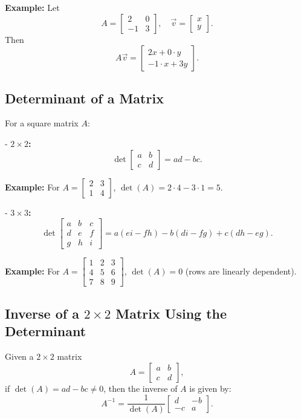 \documentclass{article}
\begin{document}
\begin{multicols}{2}
\textbf{Example:} Let
\[
A = \begin{bmatrix}2 & 0\\-1 & 3\end{bmatrix},
\quad
\vec{v} = \begin{bmatrix}x\\y\end{bmatrix}.
\]
Then
\[
A\vec{v} = \begin{bmatrix}2x + 0\cdot y\\-1\cdot x + 3y\end{bmatrix}.
\]

\subsection*{Determinant of a Matrix}
For a square matrix $A$:

- \textbf{$2\times2$:}
\[
\det\!\begin{bmatrix}a & b\\c & d\end{bmatrix} = ad - bc.
\]

\textbf{Example:} For $A=\begin{bmatrix}2 & 3\\1 & 4\end{bmatrix}$,
$\det(A)=2\cdot4 - 3\cdot1 = 5$.

- \textbf{$3\times3$:}
\[
\det\!\begin{bmatrix}a & b & c\\d & e & f\\g & h & i\end{bmatrix}
= a(ei - fh) - b(di - fg) + c(dh - eg).
\]

\textbf{Example:} For
$A=\begin{bmatrix}1 & 2 & 3\\4 & 5 & 6\\7 & 8 & 9\end{bmatrix}$,
$\det(A)=0$ (rows are linearly dependent).

\subsection*{Inverse of a $2\times2$ Matrix Using the Determinant}
Given a $2\times2$ matrix
\[
A = \begin{bmatrix}a & b\\c & d\end{bmatrix},
\]
if $\det(A) = ad - bc \neq 0$, then the inverse of $A$ is given by:
\[
A^{-1} = \frac{1}{\det(A)}\begin{bmatrix}d & -b\\-c & a\end{bmatrix}.
\]


\end{multicols}
\end{document}
